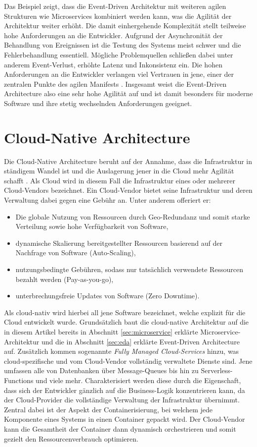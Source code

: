 \documentclass[acmtog]{acmart}
\begin{document}
Das Beispiel zeigt, dass die Event-Driven Architektur mit weiteren agilen Strukturen wie Microservices kombiniert werden kann, was die Agilität der Architektur weiter erhöht.
Die damit einhergehende Komplexität stellt teilweise hohe Anforderungen an die Entwickler.
Aufgrund der Asynchronität der Behandlung von Ereignissen ist die Testung des Systems meist schwer und die Fehlerbehandlung essentiell.
Mögliche Problemquellen schließen dabei unter anderem Event-Verlust, erhöhte Latenz und Inkonsistenz ein.
Die hohen Anforderungen an die Entwickler verlangen viel Vertrauen in jene, einer der zentralen Punkte des agilen Manifests \cite{agileManifesto}.
Insgesamt weist die Event-Driven Architecture also eine sehr hohe Agilität auf und ist damit besonders für moderne Software und ihre stetig wechselnden Anforderungen geeignet.

\section{Cloud-Native Architecture}
\label{sec:cloudnative}
Die Cloud-Native Architecture beruht auf der Annahme, dass die Infrastruktur in ständigem Wandel ist und die Auslagerung jener in die Cloud mehr Agilität schafft \cite{cloudNative}.
Als Cloud wird in diesem Fall die Infrastruktur eines oder mehrerer Cloud-Vendors bezeichnet.
Ein Cloud-Vendor bietet seine Infrastruktur und deren Verwaltung dabei gegen eine Gebühr an.
Unter anderem offeriert er:
\begin{itemize}
  \item Die globale Nutzung von Ressourcen durch Geo-Redundanz und somit starke Verteilung sowie hohe Verfügbarkeit von Software,
  \item dynamische Skalierung bereitgestellter Ressourcen basierend auf der Nachfrage von Software (Auto-Scaling),
  \item nutzungsbedingte Gebühren, sodass nur tatsächlich verwendete Ressourcen bezahlt werden (Pay-as-you-go),
  \item unterbrechungsfreie Updates von Software (Zero Downtime).
\end{itemize}

Als cloud-nativ wird hierbei all jene Software bezeichnet, welche explizit für die Cloud entwickelt wurde.
Grundsätzlich baut die cloud-native Architektur auf die in diesem Artikel bereits in Abschnitt \ref{sec:microservice} erklärte Microservice-Architektur und die
in Abschnitt \ref{sec:eda} erklärte Event-Driven Architecture auf.
Zusätzlich kommen sogenannte \textit{Fully Managed Cloud-Services} hinzu, was cloud-spezifische und vom Cloud-Vendor vollständig verwaltete Dienste sind.
Jene umfassen alle von Datenbanken über Message-Queues bis hin zu Serverless-Functions und viele mehr.
Charakterisiert werden diese durch die Eigenschaft, dass sich der Entwickler gänzlich auf die Business-Logik konzentrieren kann, da der Cloud-Provider
die vollständige Verwaltung der Infrastruktur übernimmt.
Zentral dabei ist der Aspekt der Containerisierung, bei welchem jede Komponente eines Systems in einen Container gepackt wird.
Der Cloud-Vendor kann die Gesamtheit der Container dann dynamisch orchestrieren und somit gezielt den Ressourcenverbrauch optimieren.
\end{document}

